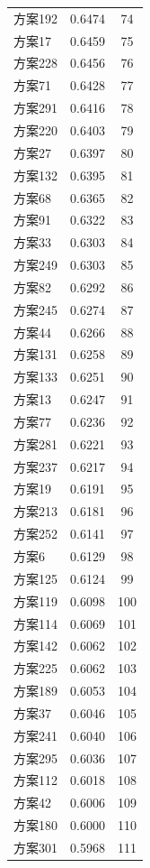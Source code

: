\documentclass[12pt,a4paper]{article}
\begin{document}
\begin{table}[H]
\begin{tabular}{lcc}
    方案192 & 0.6474 & 74 \\
    方案17 & 0.6459 & 75 \\
    方案228 & 0.6456 & 76 \\
    方案71 & 0.6428 & 77 \\
    方案291 & 0.6416 & 78 \\
    方案220 & 0.6403 & 79 \\
    方案27 & 0.6397 & 80 \\
    方案132 & 0.6395 & 81 \\
    方案68 & 0.6365 & 82 \\
    方案91 & 0.6322 & 83 \\
    方案33 & 0.6303 & 84 \\
    方案249 & 0.6303 & 85 \\
    方案82 & 0.6292 & 86 \\
    方案245 & 0.6274 & 87 \\
    方案44 & 0.6266 & 88 \\
    方案131 & 0.6258 & 89 \\
    方案133 & 0.6251 & 90 \\
    方案13 & 0.6247 & 91 \\
    方案77 & 0.6236 & 92 \\
    方案281 & 0.6221 & 93 \\
    方案237 & 0.6217 & 94 \\
    方案19 & 0.6191 & 95 \\
    方案213 & 0.6181 & 96 \\
    方案252 & 0.6141 & 97 \\
    方案6 & 0.6129 & 98 \\
    方案125 & 0.6124 & 99 \\
    方案119 & 0.6098 & 100 \\
    方案114 & 0.6069 & 101 \\
    方案142 & 0.6062 & 102 \\
    方案225 & 0.6062 & 103 \\
    方案189 & 0.6053 & 104 \\
    方案37 & 0.6046 & 105 \\
    方案241 & 0.6040 & 106 \\
    方案295 & 0.6036 & 107 \\
    方案112 & 0.6018 & 108 \\
    方案42 & 0.6006 & 109 \\
    方案180 & 0.6000 & 110 \\
    方案301 & 0.5968 & 111 \\

\end{tabular}
\end{table}
\end{document}

